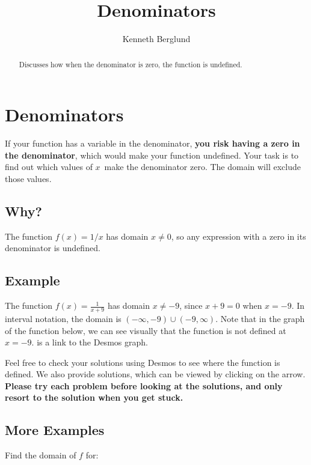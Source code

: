 \documentclass{ximera}
\title{Denominators}
\author{Kenneth Berglund}
\begin{document}
\begin{abstract}
Discusses how when the denominator is zero, the function is undefined. 
\end{abstract}
\maketitle

\section{Denominators}
If your function has a variable in the denominator, \textbf{you risk having a zero in the denominator}, which would make your function undefined. Your task is to find out which values of $x$ make the denominator zero. The domain will exclude those values.

\subsection{Why?}
The function $f(x) = 1/x$ has domain $x \ne 0$, so any expression with a zero in its denominator is undefined. 

\subsection{Example}
The function $f(x) = \frac{1}{x + 9}$ has domain $x \ne -9$, since $x + 9 = 0$ when $x = -9$. In interval notation, the domain is $(-\infty, -9) \cup (-9, \infty)$. Note that in the graph of the function below, we can see visually that the function is not defined at $x = -9$.  is a link to the Desmos graph. 

\begin{center}
\end{center}

Feel free to check your solutions using Desmos to see where the function is defined. We also provide solutions, which can be viewed by clicking on the arrow. \textbf{Please try each problem before looking at the solutions, and only resort to the solution when you get stuck.} 

\subsection{More Examples}
Find the domain of $f$ for:
\end{document}
